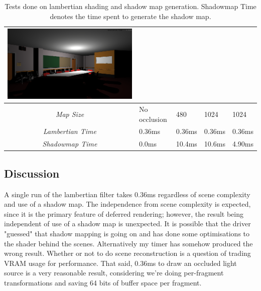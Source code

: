 \begin{table}[!ht]
\begin{center}
\begin{tabular}{| c | p{2.5cm} | p{2.5cm} | p{2.5cm} | p{2.5cm} |}
\includegraphics[scale=0.08,trim=0 0 0 -5]{img/results/shadowmap/conference1024x1024} \\
\hline 
\emph{Map Size} & No occlusion & 480 & 1024 & 1024\\
\hline
\emph{Lambertian Time} & 0.36ms & 0.36ms & 0.36ms & 0.36ms\\
\hline
\emph{Shadowmap Time} & 0.0ms & 10.4ms & 10.6ms & 4.90ms\\
\hline
\end{tabular}
\caption{Tests done on lambertian shading and shadow map generation. Shadowmap Time denotes the time spent to generate the shadow map.}
\label{table-lambert}
\end{center}
\end{table}

\subsection{Discussion}
A single run of the lambertian filter takes 0.36ms regardless of scene complexity and use of a shadow map. The independence from scene complexity is expected, since it is the primary feature of deferred rendering; however, the result being independent of use of a shadow map is unexpected. It is possible that the driver "guessed" that shadow mapping is going on and has done some optimisations to the shader behind the scenes. Alternatively my timer has somehow produced the wrong result. Whether or not to do scene reconstruction is a question of trading VRAM usage for performance. That said, 0.36ms to draw an occluded light source is a very reasonable result, considering we're doing per-fragment transformations and saving 64 bits of buffer space per fragment.

